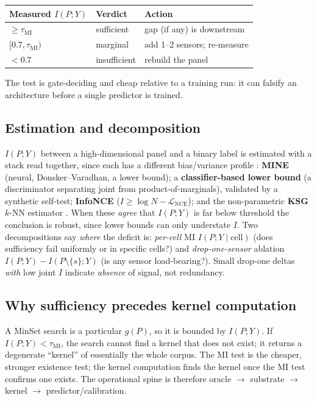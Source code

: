 \documentclass[10pt,twocolumn]{article}
\begin{document}
\begin{center}
\small
\begin{tabular}{@{}lll@{}}
\toprule
Measured $I(P;Y)$ & Verdict & Action\\
\midrule
$\ge\tau_{\mathrm{MI}}$ & sufficient & gap (if any) is downstream\\
$[0.7,\tau_{\mathrm{MI}})$ & marginal & add 1--2 sensors; re-measure\\
$<0.7$ & insufficient & rebuild the panel\\
\bottomrule
\end{tabular}
\end{center}

The test is gate-deciding and cheap relative to a training run: it can falsify an
architecture before a single predictor is trained.

\subsection{Estimation and decomposition}
$I(P;Y)$ between a high-dimensional panel and a binary label is estimated with a
stack read together, since each has a different bias/variance profile
\citep{poole2019variational}: \textbf{MINE} \citep{belghazi2018mine} (neural,
Donsker--Varadhan, a lower bound); a \textbf{classifier-based lower bound} (a
discriminator separating joint from product-of-marginals), validated by a
synthetic self-test; \textbf{InfoNCE} \citep{vandenoord2018cpc}
($I\ge\log N-\mathcal{L}_{\text{NCE}}$); and the non-parametric \textbf{KSG}
$k$-NN estimator \citep{kraskov2004estimating}. When these \emph{agree} that
$I(P;Y)$ is far below threshold the conclusion is robust, since lower bounds can
only understate $I$. Two decompositions say \emph{where} the deficit is:
\emph{per-cell} MI $I(P;Y\mid\text{cell})$ (does sufficiency fail uniformly or in
specific cells?) and \emph{drop-one-sensor} ablation $I(P;Y)-I(P\setminus\{s\};Y)$
(is any sensor load-bearing?). Small drop-one deltas \emph{with} low joint $I$
indicate \emph{absence} of signal, not redundancy.

\subsection{Why sufficiency precedes kernel computation}
A MinSet search is a particular $g(P)$, so it is bounded by $I(P;Y)$. If
$I(P;Y)<\tau_{\mathrm{MI}}$, the search cannot find a kernel that does not exist;
it returns a degenerate ``kernel'' of essentially the whole corpus. The MI test is
the cheaper, stronger existence test; the kernel computation finds the kernel once
the MI test confirms one exists. The operational spine is therefore oracle
$\to$ substrate $\to$ kernel $\to$ predictor/calibration.
\end{document}
